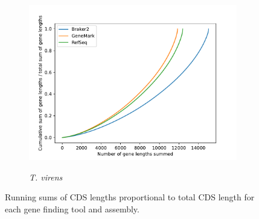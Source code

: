 \begin{figure}[ht]
  \ContinuedFloat
  \centering
    \begin{subfigure}{0.8\textwidth}
      \includegraphics[width=\textwidth]{figures/t-virens-cumulative-gene-lengths.pdf}
      \label{fig:tvirens-lengths}
      \caption{\textit{T. virens}}
    \end{subfigure}
  \label{fig:cds-lengths}
  \caption{Running sums of CDS lengths proportional to total CDS
    length for each gene finding tool and assembly.}
\end{figure}
